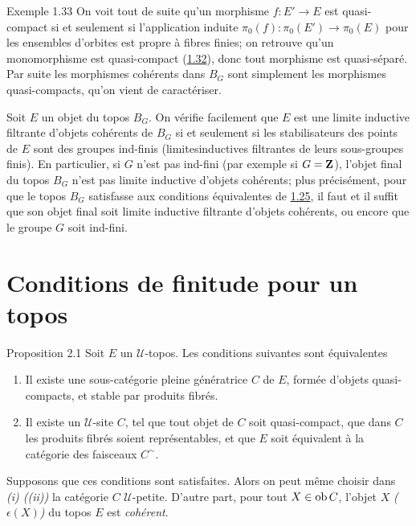 \documentclass[10pt]{../fichiers-configuration-latex/smfart}
\begin{document}
\begin{enonce*}[remark]{Exemple 1.33}
On voit tout de suite qu'un morphisme $f : E'\to E$ est
quasi-compact si et seulement si l'application induite $\pi_0(f) :
\pi_0 (E')\to \pi_{0}(E)$ pour les ensembles d'orbites est propre
\ie à fibres finies; on retrouve qu'un monomorphisme est
quasi-compact (\hyperref[VI.subsec1.32]{1.32}), donc tout morphisme est
quasi-séparé. Par suite les morphismes cohérents dans $B_G$ sont
simplement les morphismes quasi-compacts, qu'on vient de
caractériser.

Soit $E$ un objet du topos $B_G$. On vérifie facilement que $E$ est
une limite inductive filtrante d'objets cohérents de $B_G$ si et
seulement si les stabilisateurs des points de $E$ sont des groupes
ind-finis (\ie limites\pageoriginale inductives filtrantes de leurs
sous-groupes finis). En particulier, si $G$ n'est pas ind-fini (par
exemple si $G =  \mathbf{Z}$), l'objet final du topos $B_G$ n'est pas
limite inductive d'objets cohérents; plus précisément, pour que le topos $B_G$
satisfasse aux conditions équivalentes de \hyperref[VI.cor1.25]{1.25}, il faut et il suffit
que son objet final soit limite inductive filtrante d'objets
cohérents, ou encore que le groupe $G$ soit ind-fini.
\end{enonce*}


\section{Conditions de finitude pour un topos}

\begin{enonce*}{Proposition 2.1}
Soit $E$ un $𝒰$-topos. Les conditions suivantes sont équivalentes
\begin{enumerate}
\renewcommand{\theenumi}{\roman{enumi}}
\renewcommand{\labelenumi}{(\theenumi)}
\item Il existe une sous-catégorie pleine génératrice $C$ de $E$,
  formée d'objets quasi-compacts, et stable par produits fibrés.

\item Il existe un $𝒰$-site $C$, tel que tout objet de $C$ soit
  quasi-compact, que dans $C$ les produits fibrés soient
  représentables, et que $E$ soit équivalent à la catégorie des
  faisceaux $C^{\sim}$.
\end{enumerate}

Supposons que ces conditions sont satisfaites. Alors on peut même
choisir dans \emph{(i) (\resp (ii))} la catégorie $C$
$𝒰$-petite. D'autre part, pour tout $X \in \operatorname{ob} C$, l'objet
$X$ \emph{(\resp $\epsilon (X)$)} du topos $E$ est \emph{cohérent}.
\end{enonce*}
\end{document}
